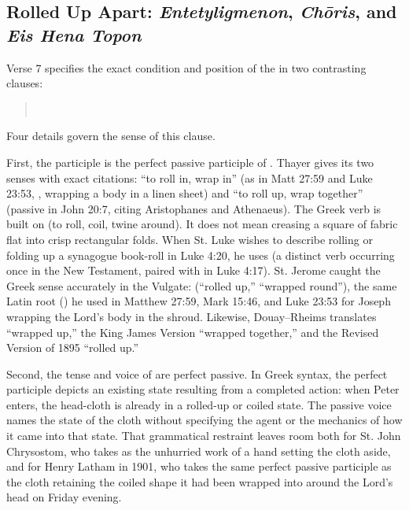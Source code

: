 \subsection{Rolled Up Apart: \emph{Entetyligmenon}, \emph{Ch\={o}ris}, and \emph{Eis Hena Topon}}

Verse 7 specifies the exact condition and position of the  in two contrasting clauses:
\begin{quote}
\\
\end{quote}
Four details govern the sense of this clause.

First, the participle  is the perfect passive participle of . Thayer gives its two senses with exact citations: ``to roll in, wrap in'' (as in Matt 27:59 and Luke 23:53, , wrapping a body in a linen sheet) and ``to roll up, wrap together'' (passive in John 20:7, citing Aristophanes and Athenaeus). The Greek verb is built on  (to roll, coil, twine around). It does not mean creasing a square of fabric flat into crisp rectangular folds. When St. Luke wishes to describe rolling or folding up a synagogue book-roll in Luke 4:20, he uses  (a distinct verb occurring once in the New Testament, paired with  in Luke 4:17). St. Jerome caught the Greek sense accurately in the Vulgate:  (``rolled up,'' ``wrapped round''), the same Latin root () he used in Matthew 27:59, Mark 15:46, and Luke 23:53 for Joseph wrapping the Lord's body in the shroud. Likewise, Douay--Rheims translates ``wrapped up,'' the King James Version ``wrapped together,'' and the Revised Version of 1895 ``rolled up.''

Second, the tense and voice of  are perfect passive. In Greek syntax, the perfect participle depicts an existing state resulting from a completed action: when Peter enters, the head-cloth is already in a rolled-up or coiled state. The passive voice names the state of the cloth without specifying the agent or the mechanics of how it came into that state. That grammatical restraint leaves room both for St. John Chrysostom, who takes  as the unhurried work of a hand setting the cloth aside, and for Henry Latham in 1901, who takes the same perfect passive participle as the cloth retaining the coiled shape it had been wrapped into around the Lord's head on Friday evening.

